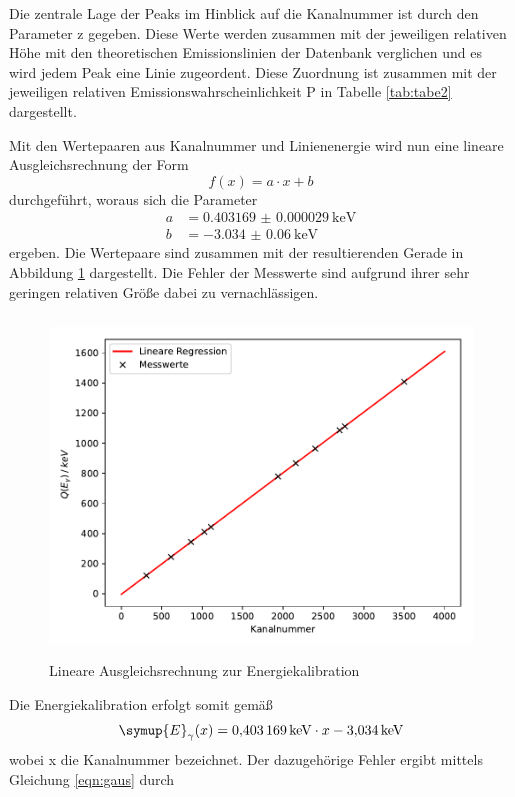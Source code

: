 Die zentrale Lage der Peaks im Hinblick auf die Kanalnummer ist durch den Parameter
z gegeben. Diese Werte werden zusammen mit der jeweiligen relativen Höhe mit den theoretischen
Emissionslinien der Datenbank \cite{lara} verglichen und es wird jedem Peak eine Linie
zugeordent. Diese Zuordnung ist zusammen mit der jeweiligen relativen Emissionswahrscheinlichkeit P
in Tabelle \ref{tab:tabe2} dargestellt.

Mit den Wertepaaren aus Kanalnummer und Linienenergie wird nun eine lineare Ausgleichsrechnung der
Form
\begin{equation}
  f(x) = a\cdot x +b
  \label{eqn:li}
\end{equation}
durchgeführt, woraus sich die Parameter
\begin{align}
  a &= \SI{0.403169(29)}{\kilo\electronvolt} \\
  b &= \SI{-3.034(60)}{\kilo\electronvolt}
\end{align}
ergeben. Die Wertepaare sind zusammen mit der resultierenden Gerade in Abbildung \ref{fig:plot3}
dargestellt. Die Fehler der Messwerte sind aufgrund ihrer sehr geringen relativen Größe dabei zu vernachlässigen.
\begin{figure}
  \centering
  \includegraphics[height=9cm]{plot3.pdf}
  \caption{Lineare Ausgleichsrechnung zur Energiekalibration}
  \label{fig:plot3}
\end{figure}
Die Energiekalibration erfolgt somit gemäß
\begin{equation}
  \symup{E}_{\gamma} (x) = \SI{0.403169}{\kilo\electronvolt}\cdot x - \SI{3.034}{\kilo\electronvolt}
  \label{eqn:gerade}
\end{equation}
wobei x die Kanalnummer bezeichnet.
Der dazugehörige Fehler ergibt mittels Gleichung \ref{eqn:gaus} durch
